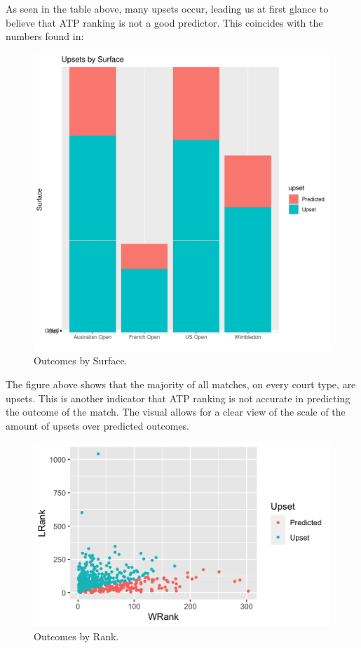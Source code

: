 \documentclass[12pt]{article}
\begin{document}
As seen in the table above, many upsets occur, leading us at first glance to believe that ATP 
ranking is not a good predictor. This coincides with the numbers found in: 


\begin{figure} [! h]
  \centering
  \includegraphics[width=\textwidth, scale=0.5]{surfaceoutcome.pdf}
  \caption{Outcomes by Surface.}
 \label{fig:surfaceupsets}
\end{figure}

The figure above shows that the majority of all matches, on every court type, are upsets. This 
is another indicator that ATP ranking is not accurate in predicting the outcome of the match. 
The visual allows for a clear view of the scale of the amount of upsets over predicted outcomes.


\begin{figure} [! h]
  \centering
  \includegraphics[width=\textwidth, scale=0.5]{rankoutcome.pdf}
  \caption{Outcomes by Rank.}
 \label{fig:rankoutcome}
\end{figure}
\end{document}
